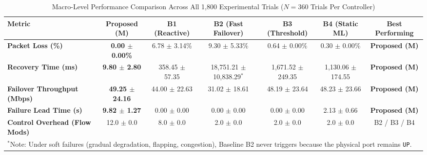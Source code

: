 \documentclass[journal,10pt,twocolumn]{IEEEtran}
\begin{document}
\begin{table}[!t]
\centering
\caption{Macro-Level Performance Comparison Across All 1,800 Experimental Trials ($N = 360$ Trials Per Controller)}
\label{tab:macro_results}
\begin{tabular}{lcccccc}
\toprule
\textbf{Metric} & \textbf{Proposed (M)} & \textbf{B1 (Reactive)} & \textbf{B2 (Fast Failover)} & \textbf{B3 (Threshold)} & \textbf{B4 (Static ML)} & \textbf{Best Performing} \\
\midrule
\textbf{Packet Loss (\%)} & \textbf{0.00 $\pm$ 0.00\%} & 6.78 $\pm$ 3.14\% & 9.30 $\pm$ 5.33\% & 0.64 $\pm$ 0.00\% & 0.30 $\pm$ 0.00\% & \textbf{Proposed (M)} \\
\textbf{Recovery Time (ms)} & \textbf{9.80 $\pm$ 2.80} & 358.45 $\pm$ 57.35 & 18,751.21 $\pm$ 10,838.29$^*$ & 1,671.52 $\pm$ 249.35 & 1,130.06 $\pm$ 174.55 & \textbf{Proposed (M)} \\
\textbf{Failover Throughput (Mbps)} & \textbf{49.25 $\pm$ 24.16} & 44.00 $\pm$ 22.63 & 31.02 $\pm$ 18.61 & 48.19 $\pm$ 23.64 & 48.23 $\pm$ 23.66 & \textbf{Proposed (M)} \\
\textbf{Failure Lead Time (s)} & \textbf{9.82 $\pm$ 1.27} & 0.00 $\pm$ 0.00 & 0.00 $\pm$ 0.00 & 0.00 $\pm$ 0.00 & 2.13 $\pm$ 0.66 & \textbf{Proposed (M)} \\
\textbf{Control Overhead (Flow Mods)} & 12.0 $\pm$ 0.0 & 8.0 $\pm$ 0.0 & 2.0 $\pm$ 0.0 & 2.0 $\pm$ 0.0 & 2.0 $\pm$ 0.0 & B2 / B3 / B4 \\
\bottomrule
\multicolumn{7}{l}{$^*$Note: Under soft failures (gradual degradation, flapping, congestion), Baseline B2 never triggers because the physical port remains \texttt{UP}.}
\end{tabular}
\end{table}
\end{document}
